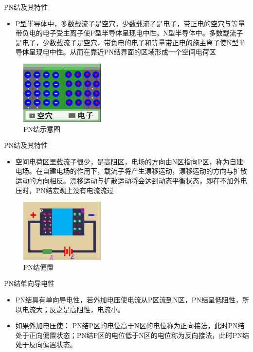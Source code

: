 \documentclass[trans]{beamer} %
\begin{document}
\begin{frame}{PN结及其特性}

    \begin{itemize}
        \item P型半导体中，多数载流子是空穴，少数载流子是电子，带正电的空穴与等量带负电的电子受主离子使P型半导体呈现电中性。N型半导体中。多数载流子是电子，少数载流子是空穴，带负电的电子和等量带正电的施主离子使N型半导体呈现电中性。从而在靠近PN结界面的区域形成一个空间电荷区  
    \end{itemize}
    \begin{figure}[htbp] 
    \centering\includegraphics[height=1.25in]{source/ch2/fg219.png} 
    \caption{PN结示意图}
    \end{figure}  
   
 
 \end{frame}

\begin{frame}{PN结及其特性}

    \begin{itemize}
        \item 空间电荷区里载流子很少，是高阻区，电场的方向由N区指向P区，称为自建电场。在自建电场的作用下，载流子将产生漂移运动，漂移运动的方向与扩散运动的方向相反。漂移运动与扩散运动将会达到动态平衡状态，即在不加外电压时，PN结宏观上没有电流流过 
    \end{itemize}
    \begin{figure}[htbp] 
    \centering\includegraphics[height=1.25in]{source/ch2/fg220.png} 
    \caption{PN结偏置}
    \end{figure}  
   
 
 \end{frame}
 
\begin{frame}{PN结单向导电性}

    \begin{itemize}
        \item PN结具有单向导电性，若外加电压使电流从P区流到N区，PN结呈低阻性，所以电流大；反之是高阻性，电流小。

        \item 如果外加电压使：
PN结P区的电位高于N区的电位称为正向接法，此时PN结处于正向偏置状态；PN结P区的电位低于N区的电位称为反向接法，此时PN结处于反向偏置状态。
    \end{itemize}
 \end{frame}
\end{document}
